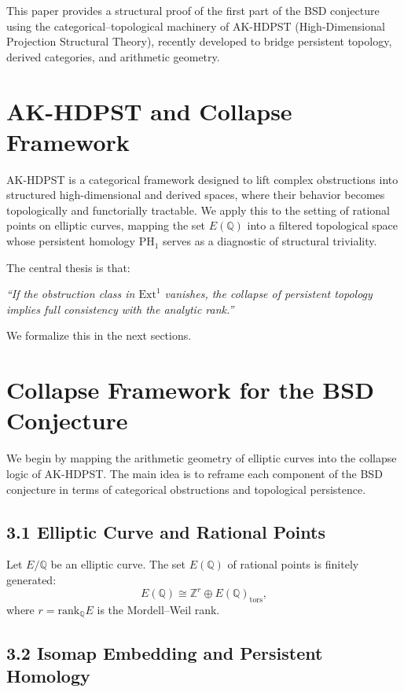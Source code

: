 This paper provides a structural proof of the first part of the BSD conjecture using the categorical–topological machinery of AK-HDPST (High-Dimensional Projection Structural Theory), recently developed to bridge persistent topology, derived categories, and arithmetic geometry.

\section{AK-HDPST and Collapse Framework}

AK-HDPST is a categorical framework designed to lift complex obstructions into structured high-dimensional and derived spaces, where their behavior becomes topologically and functorially tractable.  
We apply this to the setting of rational points on elliptic curves, mapping the set \( E(\mathbb{Q}) \) into a filtered topological space whose persistent homology \( \mathrm{PH}_1 \) serves as a diagnostic of structural triviality.

\medskip

The central thesis is that:
\begin{center}
\textit{“If the obstruction class in \( \mathrm{Ext}^1 \) vanishes, the collapse of persistent topology implies full consistency with the analytic rank.”}
\end{center}

We formalize this in the next sections.

\section{Collapse Framework for the BSD Conjecture}

We begin by mapping the arithmetic geometry of elliptic curves into the collapse logic of AK-HDPST. The main idea is to reframe each component of the BSD conjecture in terms of categorical obstructions and topological persistence.

\subsection{3.1 Elliptic Curve and Rational Points}

Let \( E/\mathbb{Q} \) be an elliptic curve. The set \( E(\mathbb{Q}) \) of rational points is finitely generated:
\[
E(\mathbb{Q}) \cong \mathbb{Z}^r \oplus E(\mathbb{Q})_{\text{tors}},
\]
where \( r = \mathrm{rank}_\mathbb{Q}E \) is the Mordell–Weil rank.

\subsection{3.2 Isomap Embedding and Persistent Homology}

